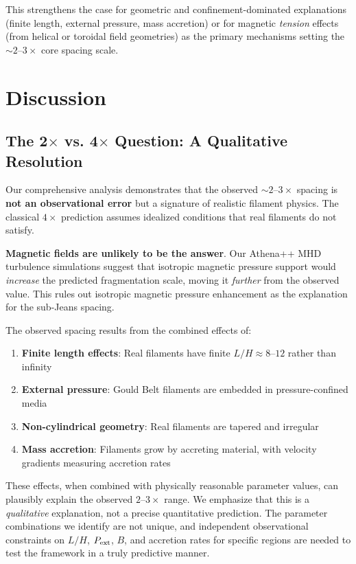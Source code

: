 \documentclass[11pt,a4paper]{article}
\begin{document}
This strengthens the case for geometric and confinement-dominated explanations (finite length, external pressure, mass accretion) or for magnetic \textit{tension} effects (from helical or toroidal field geometries) as the primary mechanisms setting the $\sim2$--$3\times$ core spacing scale.

\section{Discussion}

\subsection{The 2$\times$ vs. 4$\times$ Question: A Qualitative Resolution}

Our comprehensive analysis demonstrates that the observed $\sim2$--$3\times$ spacing is \textbf{not an observational error} but a signature of realistic filament physics. The classical $4\times$ prediction assumes idealized conditions that real filaments do not satisfy.

\textbf{Magnetic fields are unlikely to be the answer}. Our Athena++ MHD turbulence simulations suggest that isotropic magnetic pressure support would \textit{increase} the predicted fragmentation scale, moving it \textit{further} from the observed value. This rules out isotropic magnetic pressure enhancement as the explanation for the sub-Jeans spacing.

The observed spacing results from the combined effects of:
\begin{enumerate}
    \item \textbf{Finite length effects}: Real filaments have finite $L/H \approx 8$--$12$ rather than infinity
    \item \textbf{External pressure}: Gould Belt filaments are embedded in pressure-confined media
    \item \textbf{Non-cylindrical geometry}: Real filaments are tapered and irregular
    \item \textbf{Mass accretion}: Filaments grow by accreting material, with velocity gradients measuring accretion rates \citep{Heitsch2013, Chen2024, Zhang2024}
\end{enumerate}

These effects, when combined with physically reasonable parameter values, can plausibly explain the observed $2$--$3\times$ range. We emphasize that this is a \textit{qualitative} explanation, not a precise quantitative prediction. The parameter combinations we identify are not unique, and independent observational constraints on $L/H$, $P_{\rm ext}$, $B$, and accretion rates for specific regions are needed to test the framework in a truly predictive manner.
\end{document}
